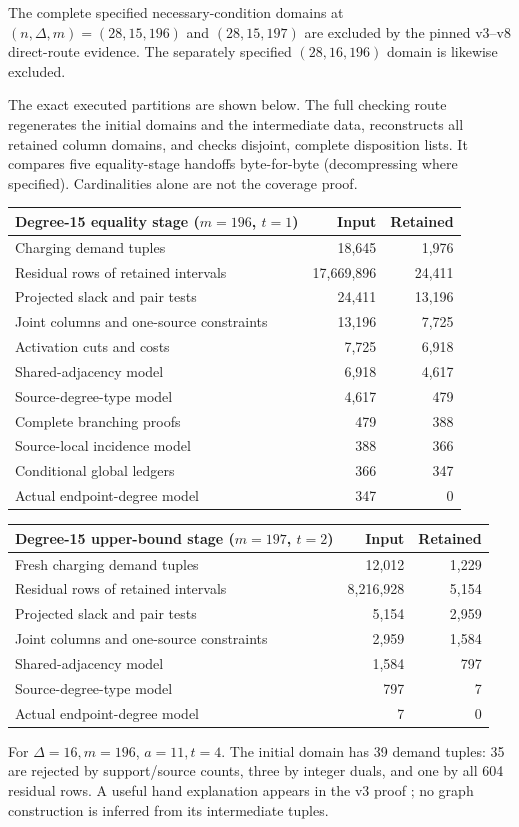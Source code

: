 \documentclass[11pt,a4paper]{article}
\begin{document}
\begin{proposition}\label{prop:finite}
The complete specified necessary-condition domains at $(n,\Delta,m)=(28,15,196)$ and $(28,15,197)$ are excluded by the pinned v3--v8 direct-route evidence. The separately specified $(28,16,196)$ domain is likewise excluded.
\end{proposition}
The exact executed partitions are shown below. The full checking route regenerates the initial domains and the intermediate data, reconstructs all retained column domains, and checks disjoint, complete disposition lists. It compares five equality-stage handoffs byte-for-byte (decompressing where specified). Cardinalities alone are not the coverage proof.
\begin{center}\small
\begin{tabular}{lrr}\toprule
Degree-15 equality stage ($m=196$, $t=1$) & Input & Retained\\\midrule
Charging demand tuples & 18,645 & 1,976\\
Residual rows of retained intervals & 17,669,896 & 24,411\\
Projected slack and pair tests & 24,411 & 13,196\\
Joint columns and one-source constraints & 13,196 & 7,725\\
Activation cuts and costs & 7,725 & 6,918\\
Shared-adjacency model & 6,918 & 4,617\\
Source-degree-type model & 4,617 & 479\\
Complete branching proofs & 479 & 388\\
Source-local incidence model & 388 & 366\\
Conditional global ledgers & 366 & 347\\
Actual endpoint-degree model & 347 & 0\\\bottomrule
\end{tabular}
\end{center}
\begin{center}\small
\begin{tabular}{lrr}\toprule
Degree-15 upper-bound stage ($m=197$, $t=2$) & Input & Retained\\\midrule
Fresh charging demand tuples & 12,012 & 1,229\\
Residual rows of retained intervals & 8,216,928 & 5,154\\
Projected slack and pair tests & 5,154 & 2,959\\
Joint columns and one-source constraints & 2,959 & 1,584\\
Shared-adjacency model & 1,584 & 797\\
Source-degree-type model & 797 & 7\\
Actual endpoint-degree model & 7 & 0\\\bottomrule
\end{tabular}
\end{center}
For $\Delta=16,m=196$, $a=11,t=4$. The initial domain has 39 demand tuples: 35 are rejected by support/source counts, three by integer duals, and one by all 604 residual rows. A useful hand explanation appears in the v3 proof \cite[Section 8]{v3}; no graph construction is inferred from its intermediate tuples.
\end{document}
